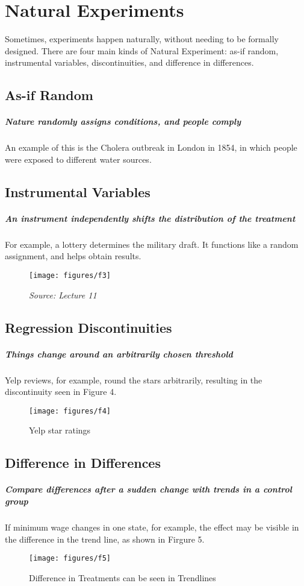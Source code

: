 \section{Natural Experiments}

Sometimes, experiments happen naturally, without needing to be formally designed. There are four main kinds of Natural Experiment: as-if random, instrumental variables, discontinuities, and difference in differences.

\subsection{As-if Random}
\subparagraph{Nature randomly assigns conditions, and people comply} An example of this is the Cholera outbreak in London in 1854, in which people were exposed to different water sources.

\subsection{Instrumental Variables}
\subparagraph{An instrument independently shifts the distribution of the treatment} For example, a lottery determines the military draft. It functions like a random assignment, and helps obtain results.

\begin{figure}[ht]
  \begin{center}
    \texttt{[image: figures/f3]}
        \caption{ \textit{ Source: Lecture 11}}
    \label{figure 3}
  \end{center}
\end{figure}


\subsection{Regression Discontinuities}
\subparagraph{Things change around an arbitrarily chosen threshold} Yelp reviews, for example, round the stars arbitrarily, resulting in the discontinuity seen in Figure 4.

\begin{figure}[ht]
  \begin{center}
    \texttt{[image: figures/f4]}
        \caption{ Yelp star ratings}
    \label{figure 4}
  \end{center}
\end{figure}

\subsection{Difference in Differences}
\subparagraph{Compare differences after a sudden change with trends in a control group} If minimum wage changes in one state, for example, the effect may be visible in the difference in the trend line, as shown in Firgure 5.

\begin{figure}[ht]
  \begin{center}
    \texttt{[image: figures/f5]}
        \caption{Difference in Treatments can be seen in Trendlines}
    \label{figure 5}
  \end{center}
\end{figure}
